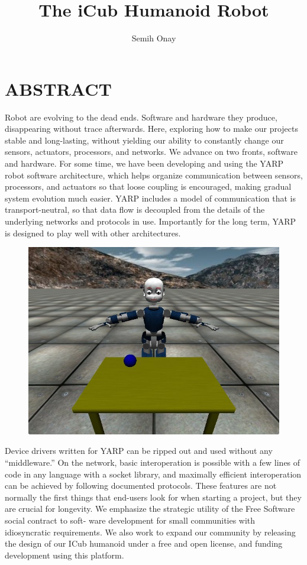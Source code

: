 \documentclass[a4paper, 12pt]{report}
\title{The iCub Humanoid Robot}
\author{Semih Onay}
\begin{document}
  \makecstitle
  
  \tableofcontents
  \listoffigures
  \listoftables
  
  \begin{symabbreviations}
    \sym{}{} 
  \end{symabbreviations}
  
  {\tiny }\chapter*{ABSTRACT}
  Robot are evolving to the dead ends. Software and hardware they produce, 
  disappearing without trace afterwards. Here, exploring how to make our 
  projects stable and long-lasting, without yielding our ability to 
  constantly change our sensors, actuators, processors, and networks.
  We advance on two fronts, software and hardware. For some time, we have been 
  developing and using the YARP robot software architecture, which helps 
  organize communication between sensors, processors, and actuators so that 
  loose 
  coupling is encouraged, making gradual system evolution much easier. YARP 
  includes a model of communication that is transport-neutral, so that data 
  flow 
  is decoupled from the details of the underlying networks and protocols in 
  use. 
  Importantly for the long term, YARP is designed to play well with other 
  architectures.
  
  \begin{figure}[h!]
    \centering
    \includegraphics[width=0.6\linewidth]{sim}
    \caption{}
    \label{fig:sim}
  \end{figure}
  
  Device drivers written for YARP can be ripped out and used 
  without any “middleware.” On the network, basic interoperation is possible 
  with 
  a few lines of code in any language with a socket library, and maximally 
  efficient interoperation can be achieved by following documented protocols. 
  These features are not normally the first things that end-users look for when 
  starting a project, but they are crucial for longevity.
  We emphasize the strategic utility of the Free Software social contract to 
  soft- ware development for small communities with idiosyncratic requirements. 
  We also work to expand our community by releasing the design of our ICub 
  humanoid under a free and open license, and funding development using this 
  platform.
  
\end{document}

